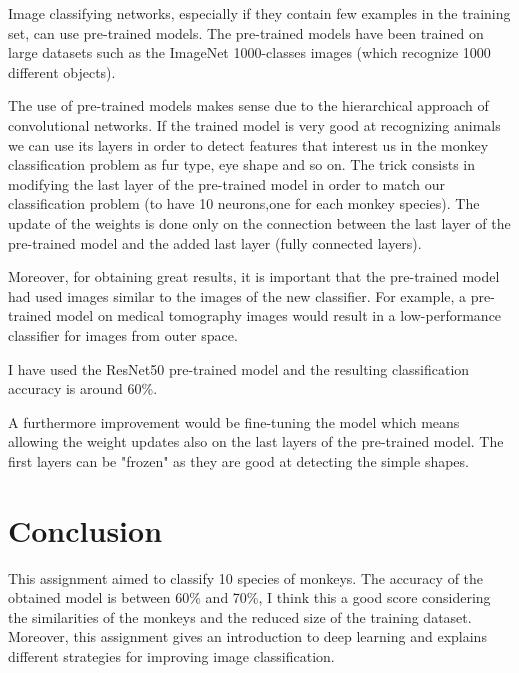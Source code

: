 \documentclass[a4paper,10pt]{article}
\begin{document}
   \quad Image classifying networks, especially if they contain few examples in the training set, can use pre-trained models. The pre-trained models have been trained on large datasets such as the ImageNet 1000-classes images (which recognize 1000 different objects). 
   
   \quad The use of pre-trained models makes sense due to the hierarchical approach of convolutional networks. If the trained model is very good at recognizing animals we can use its layers in order to detect features that interest us in the monkey classification problem as fur type, eye shape and so on. The trick consists in modifying the last layer of the pre-trained model in order to match our classification problem (to have 10 neurons,one for each monkey species). The update of the weights is done only on the connection between the last layer of the pre-trained model and the added last layer (fully connected layers).
   
   \quad Moreover, for obtaining great results, it is important that the pre-trained model had used images similar to the images of the new classifier. For example, a pre-trained model on medical tomography images would result in a low-performance classifier for images from outer space.
   
   \quad I have used the ResNet50 pre-trained model and the resulting classification accuracy is around 60\%.
  
   \quad A furthermore improvement would be fine-tuning the model which means allowing the weight updates also on the last layers of the pre-trained model. The first layers can be "frozen" as they are good at detecting the simple shapes.     
\section{Conclusion}

\quad This assignment aimed to classify 10 species of monkeys. The accuracy of the obtained model is between 60\% and 70\%, I think this a good score considering the similarities of the monkeys and the reduced size of the training dataset. Moreover, this assignment gives an introduction to deep learning and explains different strategies for improving image classification.
\end{document}

